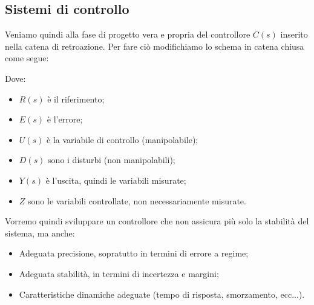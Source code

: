 \documentclass[a4paper,11pt]{article}
\begin{document}
\subsection{Sistemi di controllo}
Veniamo quindi alla fase di progetto vera e propria del controllore $C(s)$ inserito nella catena di retroazione.
Per fare ciò modifichiamo lo schema in catena chiusa come segue:
\begin{center}
\end{center}

Dove:
\begin{itemize}
	\item $R(s)$ è il riferimento;
	\item $E(s)$ è l'errore;
	\item $U(s)$ è la variabile di controllo (manipolabile);
	\item $D(s)$ sono i disturbi (non manipolabili);
	\item $Y(s)$ è l'uscita, quindi le variabili misurate;
	\item $Z$ sono le variabili controllate, non necessariamente misurate.
\end{itemize}

Vorremo quindi sviluppare un controllore che non assicura più solo la stabilità del sistema, ma anche:
\begin{itemize}
	\item Adeguata precisione, sopratutto in termini di errore a regime;
	\item Adeguata stabilità, in termini di incertezza e margini;
	\item Caratteristiche dinamiche adeguate (tempo di risposta, smorzamento, ecc...).
\end{itemize}
\end{document}
